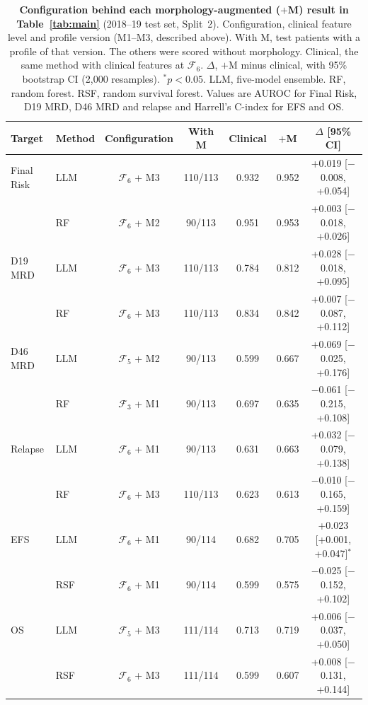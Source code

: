 \documentclass[pdflatex,sn-nature]{sn-jnl}
\begin{document}
\begin{appendices}
\begin{table}[ht]
\caption{\textbf{Configuration behind each morphology-augmented
($+$M) result in Table~\ref{tab:main}} (2018--19 test set, Split~2).
Configuration, clinical feature level and profile version (M1--M3,
described above). With M, test patients with a profile of that
version. The others were scored without
morphology. Clinical, the same method with clinical features at
$\mathcal{F}_6$. $\Delta$, $+$M minus clinical, with 95\% bootstrap CI
(2,000 resamples). $^{*}p<0.05$. LLM, five-model ensemble. RF, random
forest. RSF, random survival forest. Values are AUROC for Final Risk,
D19 MRD, D46 MRD and relapse and Harrell's C-index for EFS and OS.}
\label{tab:morph_config}
\centering
\footnotesize
\setlength{\tabcolsep}{4pt}
\begin{tabular}{@{}llccccc@{}}
\toprule
\textbf{Target} & \textbf{Method} & \textbf{Configuration} & \textbf{With M} & \textbf{Clinical} & \textbf{$+$M} & \textbf{$\Delta$ [95\% CI]} \\
\midrule
Final Risk & LLM & $\mathcal{F}_6$ + M3 & 110/113 & 0.932 & 0.952 & +0.019 [$-$0.008, +0.054] \\
 & RF & $\mathcal{F}_6$ + M2 & 90/113 & 0.951 & 0.953 & +0.003 [$-$0.018, +0.026] \\
\addlinespace[2pt]
D19 MRD & LLM & $\mathcal{F}_6$ + M3 & 110/113 & 0.784 & 0.812 & +0.028 [$-$0.018, +0.095] \\
 & RF & $\mathcal{F}_6$ + M3 & 110/113 & 0.834 & 0.842 & +0.007 [$-$0.087, +0.112] \\
\addlinespace[2pt]
D46 MRD & LLM & $\mathcal{F}_5$ + M2 & 90/113 & 0.599 & 0.667 & +0.069 [$-$0.025, +0.176] \\
 & RF & $\mathcal{F}_3$ + M1 & 90/113 & 0.697 & 0.635 & $-$0.061 [$-$0.215, +0.108] \\
\addlinespace[2pt]
Relapse & LLM & $\mathcal{F}_6$ + M1 & 90/113 & 0.631 & 0.663 & +0.032 [$-$0.079, +0.138] \\
 & RF & $\mathcal{F}_6$ + M3 & 110/113 & 0.623 & 0.613 & $-$0.010 [$-$0.165, +0.159] \\
\addlinespace[2pt]
EFS & LLM & $\mathcal{F}_6$ + M1 & 90/114 & 0.682 & 0.705 & +0.023 [+0.001, +0.047]$^{*}$ \\
 & RSF & $\mathcal{F}_6$ + M1 & 90/114 & 0.599 & 0.575 & $-$0.025 [$-$0.152, +0.102] \\
\addlinespace[2pt]
OS & LLM & $\mathcal{F}_5$ + M3 & 111/114 & 0.713 & 0.719 & +0.006 [$-$0.037, +0.050] \\
 & RSF & $\mathcal{F}_6$ + M3 & 111/114 & 0.599 & 0.607 & +0.008 [$-$0.131, +0.144] \\
\bottomrule
\end{tabular}
\end{table}


\end{appendices}
\end{document}
